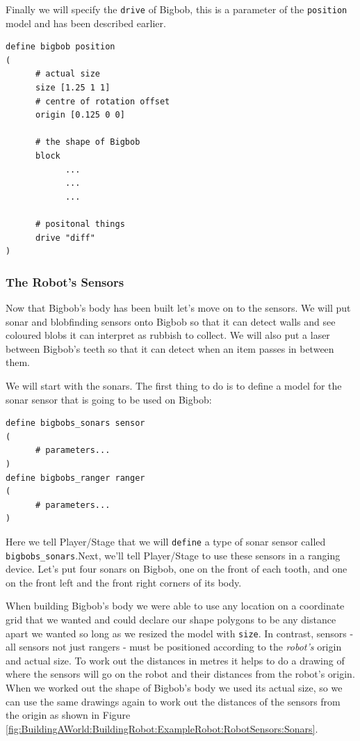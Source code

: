 \documentclass[a4paper]{report}
\newcommand{\plst}{Player/Stage\xspace}
\begin{document}
Finally we will specify the \verb|drive| of Bigbob, this is a parameter of the \verb|position| model and has been described earlier.
\begin{verbatim}
define bigbob position
(
      # actual size
      size [1.25 1 1]
      # centre of rotation offset
      origin [0.125 0 0]

      # the shape of Bigbob
      block
            ...
            ...
            ...
      
      # positonal things
      drive "diff"
)
\end{verbatim}


\subsubsection{The Robot's Sensors}\label{sec:BuildingAWorld:BuildingRobot:ExampleRobot:RobotSensors}
Now that Bigbob's body has been built let's move on to the sensors. We will put sonar and blobfinding sensors onto Bigbob so that it can detect walls and see coloured blobs it can interpret as rubbish to collect. We will also put a laser between Bigbob's teeth so that it can detect when an item passes in between them.

We will start with the sonars. The first thing to do is to define a model
for the sonar sensor that is going to be used on Bigbob:
\begin{verbatim}
define bigbobs_sonars sensor
(
      # parameters...
)
define bigbobs_ranger ranger
(
      # parameters...
)
\end{verbatim}
Here we tell \plst that we will \verb|define| a type of sonar sensor called \verb|bigbobs_sonars|.Next, we'll tell Player/Stage to use these sensors in a ranging device. Let's put four sonars on Bigbob, one on the front of each tooth, and one on the front left and the front right corners of its body. 

When building Bigbob's body we were able to use any location on a coordinate grid that we wanted and could declare our shape polygons to be any distance apart we wanted so long as we resized the model with \verb|size|. 
In contrast, sensors - all sensors not just rangers - must be positioned according to the \emph{robot's} origin and actual size. To work out the distances in metres it helps to do a drawing of where the sensors will go on the robot and their distances from the robot's origin. 
When we worked out the shape of Bigbob's body we used its actual size, so we can use the same drawings again to work out the distances of the sensors from the origin as shown in Figure \ref{fig:BuildingAWorld:BuildingRobot:ExampleRobot:RobotSensors:Sonars}.
\end{document}
